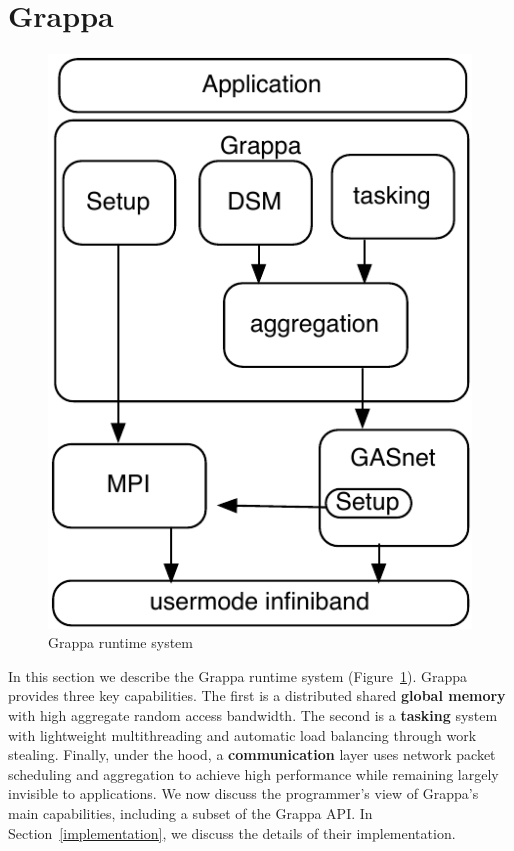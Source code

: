 \section{Grappa} \label{sec:grappa}

\begin{figure}[t]
\begin{center}
  \includegraphics[width=0.5\columnwidth]{figs/grappa-crappy}
\begin{minipage}{0.95\columnwidth}
  \caption{\label{fig:grappa} Grappa runtime system \vspace{-4ex}}
\end{minipage}
\vspace{-3ex}
\end{center}
\end{figure}

In this section we describe the Grappa runtime system
(Figure~\ref{fig:grappa}). 
Grappa provides three key capabilities. The first is a distributed
shared \textbf{global memory} with high aggregate random access
bandwidth. The second is a \textbf{tasking} system with lightweight
multithreading and automatic load balancing through work
stealing. Finally, under the hood, a \textbf{communication} layer uses
network packet scheduling and aggregation to achieve high performance
while remaining largely invisible to applications. We now discuss the programmer's view of
Grappa's main capabilities, including a subset of the Grappa API. In
Section~\ref{implementation}, we discuss the details of their
implementation.


